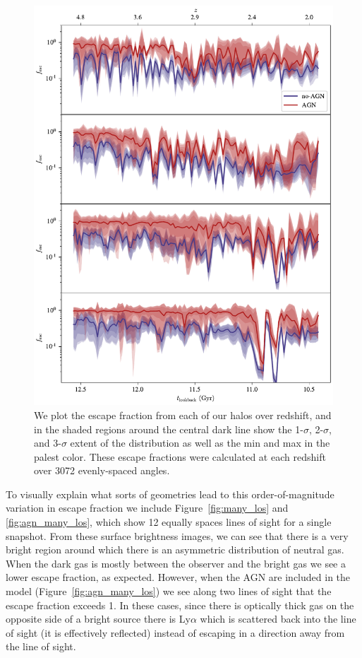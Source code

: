 \begin{figure}
    \centering
    \includegraphics[width=\textwidth,height=0.9\textheight,keepaspectratio]{figures/agn_los.pdf}
    \caption{
         We plot the escape fraction from each of our halos over redshift, and in the shaded regions around the central dark line show the 1-$\sigma$, 2-$\sigma$, and 3-$\sigma$ extent of the distribution as well as the min and max in the palest color.
        These escape fractions were calculated at each redshift over 3072 evenly-spaced angles.
    }
    \label{fig:agn_los}
\end{figure}

To visually explain what sorts of geometries lead to this order-of-magnitude variation in escape fraction we include Figure~\ref{fig:many_los} and \ref{fig:agn_many_los}, which show 12 equally spaces lines of sight for a single snapshot.
From these surface brightness images, we can see that there is a very bright region around which there is an asymmetric distribution of neutral gas.
When the dark gas is mostly between the observer and the bright gas we see a lower escape fraction, as expected.
However, when the AGN are included in the model (Figure~\ref{fig:agn_many_los}) we see along two lines of sight that the escape fraction exceeds 1.
In these cases, since there is optically thick gas on the opposite side of a bright source there is Ly$\alpha$ which is scattered back into the line of sight (it is effectively reflected) instead of escaping in a direction away from the line of sight.


